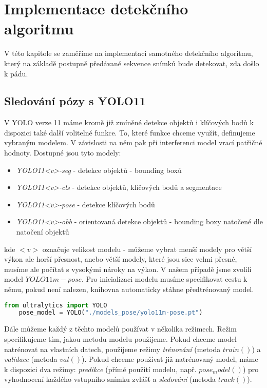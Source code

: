 \chapter{Implementace detekčního algoritmu}
\label{chap:detectionAlgorithm}

V této kapitole se zaměříme na implementaci samotného detekčního algoritmu,
který na základě postupně předávané sekvence snímků bude detekovat, zda došlo k
pádu.

\section{Sledování pózy s YOLO11}

V YOLO verze 11 máme kromě již zmíněné detekce objektů i klíčových bodů k
dispozici také další volitelné funkce. To, které funkce chceme využít,
definujeme vybraným modelem. V závislosti na něm pak při interferenci model
vrací patřičné hodnoty. Dostupné jsou tyto modely:
\begin{itemize}
    \item \textit{YOLO11<v>-seg }- detekce objektů - bounding boxů
    \item \textit{YOLO11<v>-cls }- detekce objektů, klíčových bodů a segmentace
    \item \textit{YOLO11<v>-pose} - detekce klíčových bodů
    \item \textit{YOLO11<v>-obb }- orientovaná detekce objektů - bounding boxy natočené dle natočení objektů
\end{itemize}

kde $<v>$ označuje velikost modelu - můžeme vybrat menší modely pro větší výkon
ale horší přesnost, anebo větší modely, které jsou sice velmi přesné, musíme
ale počítat s vysokými nároky na výkon. V našem případě jsme zvolili model
$YOLO11m-pose$. Pro inicializaci modelu musíme specifikovat cestu k němu, pokud
není nalezen, knihovna automaticky stáhne předtrénovaný model.

\begin{lstlisting}[language=Python, label=src:params, caption={Inicializace modelu $YOLO11m-pose$}]    
    from ultralytics import YOLO    
    pose_model = YOLO("./models_pose/yolo11m-pose.pt")
\end{lstlisting}

Dále můžeme každý z těchto modelů používat v několika režimech. Režim
specifikujeme tím, jakou metodu modelu použijeme. Pokud chceme model natrénovat
na vlastních datech, použijeme režimy \textit{trénování} (metoda $train()$) a
\textit{validace} (metoda $val()$). Pokud chceme používat již natrénovaný
model, máme k dispozici dva režimy: \textit{predikce} (přímé použití modelu,
např. $pose_model()$) pro vyhodnocení každého vstupního snímku zvlášť a
\textit{sledování} (metoda $track()$).

